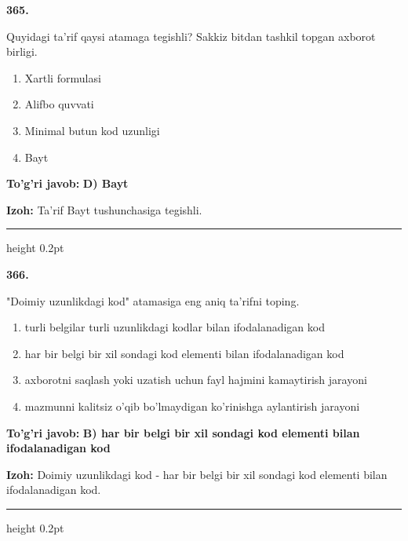 \documentclass[10pt,a4paper,oneside]{article}
\begin{document}
\noindent\textbf{\color{ink}365.}
\par
Quyidagi ta'rif qaysi atamaga tegishli? Sakkiz bitdan tashkil topgan axborot birligi.
\begin{enumerate}[label=\Alph*),leftmargin=9mm]
\item Xartli formulasi
\item Alifbo quvvati
\item Minimal butun kod uzunligi
\item Bayt
\end{enumerate}
\begin{tcolorbox}[enhanced,breakable,colback=teal!4,colframe=teal!50!black,boxrule=0.5pt,arc=1.1mm,left=3mm,right=3mm,top=1.7mm,bottom=1.7mm,before skip=2mm,after skip=2mm]
\textbf{\color{teal}To'g'ri javob:} \textbf{D) Bayt}
\par\smallskip
\textbf{Izoh:} Ta'rif Bayt tushunchasiga tegishli.
\end{tcolorbox}
\vspace{2mm}\hrule height 0.2pt \vspace{3mm}

\noindent\textbf{\color{ink}366.}
\par
"Doimiy uzunlikdagi kod" atamasiga eng aniq ta'rifni toping.
\begin{enumerate}[label=\Alph*),leftmargin=9mm]
\item turli belgilar turli uzunlikdagi kodlar bilan ifodalanadigan kod
\item har bir belgi bir xil sondagi kod elementi bilan ifodalanadigan kod
\item axborotni saqlash yoki uzatish uchun fayl hajmini kamaytirish jarayoni
\item mazmunni kalitsiz o'qib bo'lmaydigan ko'rinishga aylantirish jarayoni
\end{enumerate}
\begin{tcolorbox}[enhanced,breakable,colback=teal!4,colframe=teal!50!black,boxrule=0.5pt,arc=1.1mm,left=3mm,right=3mm,top=1.7mm,bottom=1.7mm,before skip=2mm,after skip=2mm]
\textbf{\color{teal}To'g'ri javob:} \textbf{B) har bir belgi bir xil sondagi kod elementi bilan ifodalanadigan kod}
\par\smallskip
\textbf{Izoh:} Doimiy uzunlikdagi kod - har bir belgi bir xil sondagi kod elementi bilan ifodalanadigan kod.
\end{tcolorbox}
\vspace{2mm}\hrule height 0.2pt \vspace{3mm}
\end{document}

